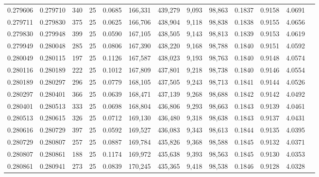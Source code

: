\begin{tabular}{rrrrrrrrrrrrr}
0.279606 & 0.279710 &   340 &  25 &                                     0.0685 & 166,331 & 439,279 &   9,093 &  98,863 & 0.1837 & 0.9158 & 4.0691 \\
0.279711 & 0.279830 &   375 &  25 &                                     0.0625 & 166,706 & 438,904 &   9,118 &  98,838 & 0.1838 & 0.9155 & 4.0656 \\
0.279830 & 0.279948 &   399 &  25 &                                     0.0590 & 167,105 & 438,505 &   9,143 &  98,813 & 0.1839 & 0.9153 & 4.0619 \\
0.279949 & 0.280048 &   285 &  25 &                                     0.0806 & 167,390 & 438,220 &   9,168 &  98,788 & 0.1840 & 0.9151 & 4.0592 \\
0.280049 & 0.280115 &   197 &  25 &                                     0.1126 & 167,587 & 438,023 &   9,193 &  98,763 & 0.1840 & 0.9148 & 4.0574 \\
0.280116 & 0.280189 &   222 &  25 &                                     0.1012 & 167,809 & 437,801 &   9,218 &  98,738 & 0.1840 & 0.9146 & 4.0554 \\
0.280189 & 0.280297 &   296 &  25 &                                     0.0779 & 168,105 & 437,505 &   9,243 &  98,713 & 0.1841 & 0.9144 & 4.0526 \\
0.280297 & 0.280401 &   366 &  25 &                                     0.0639 & 168,471 & 437,139 &   9,268 &  98,688 & 0.1842 & 0.9142 & 4.0492 \\
0.280401 & 0.280513 &   333 &  25 &                                     0.0698 & 168,804 & 436,806 &   9,293 &  98,663 & 0.1843 & 0.9139 & 4.0461 \\
0.280513 & 0.280615 &   326 &  25 &                                     0.0712 & 169,130 & 436,480 &   9,318 &  98,638 & 0.1843 & 0.9137 & 4.0431 \\
0.280616 & 0.280729 &   397 &  25 &                                     0.0592 & 169,527 & 436,083 &   9,343 &  98,613 & 0.1844 & 0.9135 & 4.0395 \\
0.280729 & 0.280807 &   257 &  25 &                                     0.0887 & 169,784 & 435,826 &   9,368 &  98,588 & 0.1845 & 0.9132 & 4.0371 \\
0.280807 & 0.280861 &   188 &  25 &                                     0.1174 & 169,972 & 435,638 &   9,393 &  98,563 & 0.1845 & 0.9130 & 4.0353 \\
0.280861 & 0.280941 &   273 &  25 &                                     0.0839 & 170,245 & 435,365 &   9,418 &  98,538 & 0.1846 & 0.9128 & 4.0328 \\

\end{tabular}
